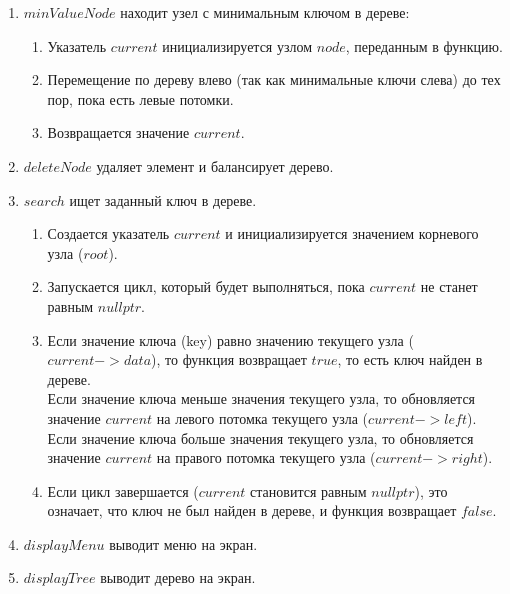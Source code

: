 \documentclass[12pt, a4paper]{article}
\begin{document}
\begin{enumerate}
	\item $minValueNode$ находит узел с минимальным ключом в дереве:
	\begin{enumerate}
		\item Указатель $current$ инициализируется узлом $node$, переданным 
		в функцию.
		\item Перемещение по дереву влево (так как минимальные ключи слева) 
		до тех пор, пока есть левые потомки.
		\item Возвращается значение $current$.
	\end{enumerate}
	\item $deleteNode$ удаляет элемент и балансирует дерево.
	\item $search$ ищет заданный ключ в дереве.
	\begin{enumerate}
		\item Создается указатель $current$ и инициализируется значением корневого узла ($root$).
		\item Запускается цикл, который будет выполняться, пока $current$ не станет равным $nullptr$.
		\item Если значение ключа (key) равно значению текущего узла 
		($current->data$), то функция возвращает $true$, то есть 
		ключ найден в дереве.\\
		Если значение ключа меньше значения текущего узла, то обновляется 
		значение $current$ на левого потомка текущего узла ($current-
		>left$).\\
		Если значение ключа больше значения текущего узла, то обновляется 
		значение $current$ на правого потомка текущего узла ($current-
		>right$).
		\item Если цикл завершается ($current$ становится равным 
		$nullptr$), это означает, что ключ не был найден в дереве, и 
		функция возвращает $false$.
	\end{enumerate}
	\item $displayMenu$ выводит меню на экран.
	\item $displayTree$ выводит дерево на экран.
\end{enumerate}
\newpage
\end{document}
